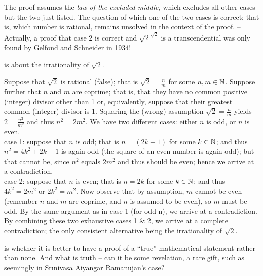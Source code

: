 The proof assumes the {\em law of the excluded middle,}
which excludes all other cases but the two just listed.
The question of which one of the two cases is correct; that is,
which number is rational, remains unsolved in the context of the proof.
--
Actually, a proof that case 2 is correct and  $\sqrt{2} ^{
 \sqrt{2} }$ is a transcendential was only found by  Gelfond and Schneider
in 1934!


 is about the irrationality of $\sqrt{2}$.

{\color{OliveGreen}
\bproof
Suppose that $\sqrt{2}$ is rational (false); that is
$\sqrt{2} = \frac{n}{m}$ for some $n, m \in {\Bbb N}$.
Suppose further that $n$ and $m$ are coprime;
that is, that they have no common positive (integer) divisor other than 1 or, equivalently,
suppose that their greatest common (integer) divisor is 1.
Squaring the  (wrong) assumption $\sqrt{2} = \frac{n}{m}$ yields $2= \frac{n^2}{m^2}$ and thus $n^2 =2m^2$.
We have two different cases: either $n$ is odd, or $n$ is even.
 \\
case 1: suppose that $n$ is odd; that is $n=(2k+1)$ for some $k\in {\Bbb N}$; and thus
$n^2 = 4k^2+2k+1$ is again odd (the square of an even number is again odd); but that cannot be,
since $n^2$ equals $2m^2$ and thus should be even; hence we arrive at a contradiction.
\\
case 2:  suppose that $n$ is even;  that is $n=2k$ for some $k\in {\Bbb N}$; and thus
$4k^2 = 2m^2$ or $2k^2 = m^2$.
Now observe that by assumption, $m$ cannot be even (remember  $n$ and $m$ are coprime, and
$n$ is assumed to be even), so $m$ must be odd. By the same argument as in case 1 (for odd n),
we arrive at a contradiction.
By combining these two exhaustive cases 1 \& 2, we arrive at a complete contradiction;
the only consistent alternative being the irrationality of $\sqrt{2}$.
\eproof
}


 is whether it is better to have a proof of a ``true'' mathematical statement rather than none.
And what is truth -- can it be some revelation, a rare gift, such as seemingly in Sr\={i}niv\={a}sa Aiyang\={a}r
R\={a}m\={a}nujan's case?


